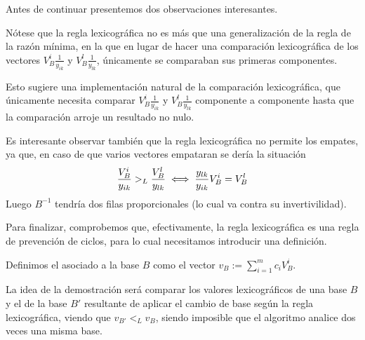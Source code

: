 Antes de continuar presentemos dos observaciones interesantes.
\begin{obs}[Generalización]
	Nótese que la regla lexicográfica no es más que una generalización de la regla de la razón mínima, en la que en lugar de hacer una comparación lexicográfica de los vectores $V_B^i\frac{1}{y_{ik}}$ y $V_B^l\frac{1}{y_{lk}}$, únicamente se comparaban sus primeras componentes.
	
	Esto sugiere una implementación natural de la comparación lexicográfica, que únicamente necesita comparar $V_B^i\frac{1}{y_{ik}}$ y $V_B^l\frac{1}{y_{lk}}$ componente a componente hasta que la comparación arroje un resultado no nulo.
\end{obs}
\begin{obs}
	Es interesante observar también que la regla lexicográfica no permite los empates, ya que, en caso de que varios vectores empataran se dería la situación
	\begin{equation*}
		\frac{V_B^i}{y_{ik}}>_L\frac{V_B^l}{y_{lk}}\iff \frac{y_{lk}}{y_{ik}}V_B^i=V_B^l
	\end{equation*}
	Luego $B^{-1}$ tendría dos filas proporcionales (lo cual va contra su invertivilidad).
\end{obs}
Para finalizar, comprobemos que, efectivamente, la regla lexicográfica es una regla de prevención de ciclos, para lo cual necesitamos introducir una definición.
\begin{defi}
	Definimos el  asociado a la base $B$ como el vector $v_B:=\sum_{i=1}^{m}c_iV_B^i$.
\end{defi}
La idea de la demostración será comparar los valores lexicográficos de una base $B$ y el de la base $B'$ resultante de aplicar el cambio de base según la regla lexicográfica, viendo que $v_{B'}<_Lv_B$, siendo imposible que el algoritmo analice dos veces una misma base.

